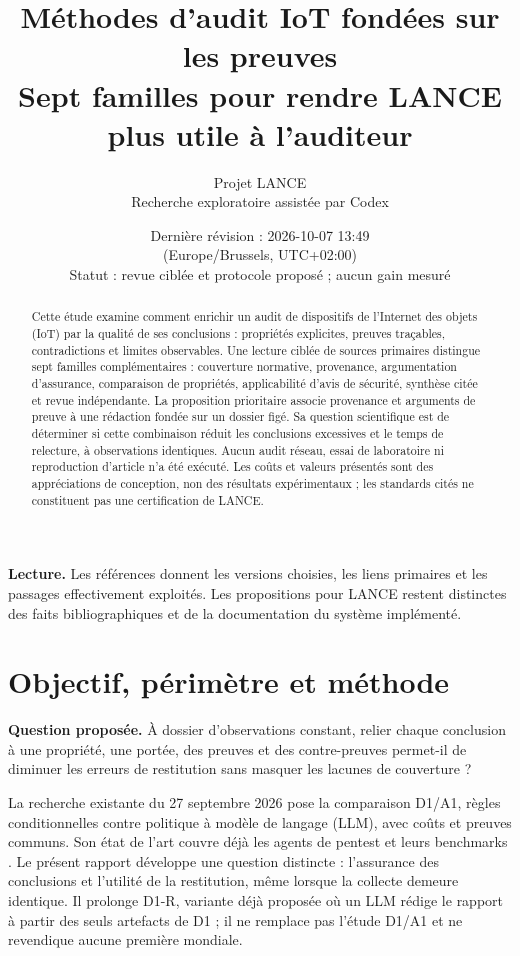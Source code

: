 \documentclass[11pt,a4paper]{article}
\title{Méthodes d'audit IoT fondées sur les preuves\\
\large Sept familles pour rendre LANCE plus utile à l'auditeur}
\author{Projet LANCE\\\small Recherche exploratoire assistée par Codex}
\date{\small Dernière révision : 2026-10-07 13:49\\
(Europe/Brussels, UTC+02:00)\\[3pt]
Statut : revue ciblée et protocole proposé ; aucun gain mesuré}
\begin{document}
\maketitle
\begin{abstract}
Cette étude examine comment enrichir un audit de dispositifs de l’Internet des objets (IoT) par la qualité de ses conclusions : propriétés explicites, preuves traçables, contradictions et limites observables. Une lecture ciblée de sources primaires distingue sept familles complémentaires : couverture normative, provenance, argumentation d'assurance, comparaison de propriétés, applicabilité d'avis de sécurité, synthèse citée et revue indépendante. La proposition prioritaire associe provenance et arguments de preuve à une rédaction fondée sur un dossier figé. Sa question scientifique est de déterminer si cette combinaison réduit les conclusions excessives et le temps de relecture, à observations identiques. Aucun audit réseau, essai de laboratoire ni reproduction d'article n'a été exécuté. Les coûts et valeurs présentés sont des appréciations de conception, non des résultats expérimentaux ; les standards cités ne constituent pas une certification de LANCE.
\end{abstract}
\tableofcontents
\bigskip
\noindent\textbf{Lecture.} Les références donnent les versions choisies, les liens primaires et les passages effectivement exploités. Les propositions pour LANCE restent distinctes des faits bibliographiques et de la documentation du système implémenté.

\newpage
\section{Objectif, périmètre et méthode}
\textbf{Question proposée.} À dossier d'observations constant, relier chaque conclusion à une propriété, une portée, des preuves et des contre-preuves permet-il de diminuer les erreurs de restitution sans masquer les lacunes de couverture ?

La recherche existante du 27 septembre 2026 pose la comparaison D1/A1, règles conditionnelles contre politique à modèle de langage (LLM), avec coûts et preuves communs. Son état de l'art couvre déjà les agents de pentest et leurs benchmarks \cite{lance}. Le présent rapport développe une question distincte : l'assurance des conclusions et l'utilité de la restitution, même lorsque la collecte demeure identique. Il prolonge D1-R, variante déjà proposée où un LLM rédige le rapport à partir des seuls artefacts de D1 ; il ne remplace pas l'étude D1/A1 et ne revendique aucune première mondiale.
\end{document}
